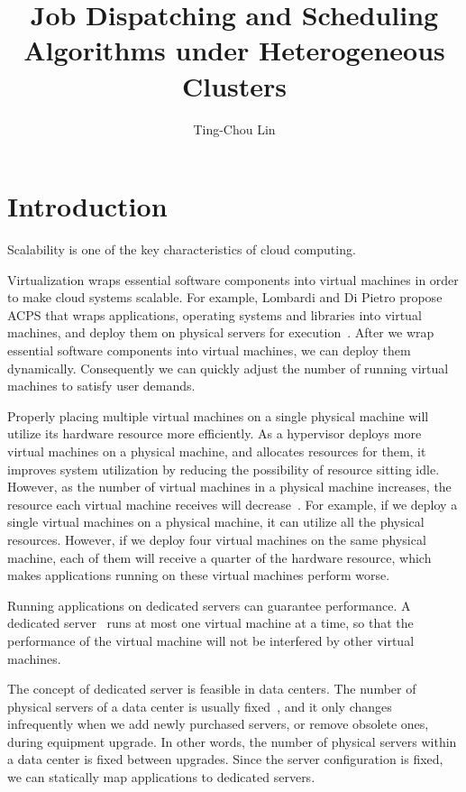 \documentclass[11pt]{article}
\title{Job Dispatching and Scheduling Algorithms under Heterogeneous
  Clusters}
\author{Ting-Chou Lin}
\date{}
\begin{document}
\maketitle

\section{Introduction}

Scalability is one of the key characteristics of cloud computing.

Virtualization wraps essential software components into virtual machines
in order to make cloud systems scalable.  For example, Lombardi and Di
Pietro propose ACPS
that wraps applications, operating systems and libraries into virtual
machines, and deploy them on physical servers for
execution~\cite{secure_virt_for_cloud, cloud_issue}.  After we wrap
essential software components into virtual machines, we can deploy them
dynamically.  Consequently we can quickly adjust the number of running
virtual machines to satisfy user demands.

Properly placing multiple virtual machines on a single physical machine
will utilize its hardware resource more efficiently.  As a hypervisor
deploys more virtual machines on a physical machine, and allocates
resources for them, it improves system utilization by reducing the
possibility of resource sitting idle.  However, as the number of virtual
machines in a physical machine increases, the resource each virtual
machine receives will decrease~\cite{resource_overbooking}.  For
example, if we deploy a single virtual machines on a physical machine,
it can utilize all the physical resources.  However, if we deploy four
virtual machines on the same physical machine, each of them will receive
a quarter of the hardware resource, which makes applications running on
these virtual machines perform worse.

Running applications on dedicated servers can guarantee performance.  A
dedicated server~\cite{dedicated_hosting} runs at most one virtual
machine at a time, so that the performance of the virtual machine will
not be interfered by other virtual machines.

The concept of dedicated server is feasible in data centers.  The
number of physical servers of a data center is usually
fixed~\cite{maintenance_framework}, and it only changes infrequently
when we add newly purchased servers, or remove obsolete ones, during
equipment upgrade.  In other words, the number of physical servers
within a data center is fixed between upgrades.  Since the server
configuration is fixed, we can statically map applications to
dedicated servers.
\end{document}
